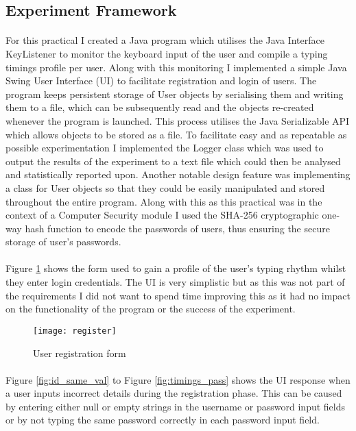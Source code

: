 \documentclass{article}
\begin{document}
\subsection{Experiment Framework} \label{setup}
\paragraph{}
For this practical I created a Java program which utilises the Java Interface KeyListener to monitor the keyboard input of the user and compile a typing timings profile per user. Along with this monitoring I implemented a simple Java Swing User Interface (UI) to facilitate registration and login of users. The program keeps persistent storage of User objects by serialising them and writing them to a file, which can be subsequently read and the objects re-created whenever the program is launched. This process utilises the Java Serializable API which allows objects to be stored as a file. To facilitate easy and as repeatable as possible experimentation I implemented the Logger class which was used to output the results of the experiment to a text file which could then be analysed and statistically reported upon. Another notable design feature was implementing a class for User objects so that they could be easily manipulated and stored throughout the entire program. Along with this as this practical was in the context of a Computer Security module I used the SHA-256 cryptographic one-way hash function to encode the passwords of users, thus ensuring the secure storage of user's passwords.       
\paragraph{}
Figure \ref{fig:register} shows the form used to gain a profile of the user's typing rhythm whilst they enter login credentials. The UI is very simplistic but as this was not part of the requirements I did not want to spend time improving this as it had no impact on the functionality of the program or the success of the experiment. 

\begin{figure}[H]
    \centering
    \texttt{[image: register]}
    \caption{User registration form}
    \label{fig:register}
\end{figure}

\paragraph{}
Figure \ref{fig:id_same_val} to Figure \ref{fig:timings_pass} shows the UI response when a user inputs incorrect details during the registration phase. This can be caused by entering either null or empty strings in the username or password input fields or by not typing the same password correctly in each password input field. 
\end{document}
